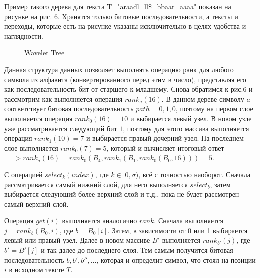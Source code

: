 \documentclass[a4paper,12pt]{article}
\begin{document}
Пример такого дерева для текста T="araadl\_ll\$\_bbaar\_aaaa" показан на рисунке на рис. 6. Хранятся только битовые последовательности, а тексты и переходы, которые есть на рисунке указаны исключительно в целях удобства и наглядности.

\begin{figure}[h!]
\caption{Wavelet Tree}
\end{figure}
\newpage

Данная структура данных позволяет выполнять операцию ранк для любого символа из алфавита (конвертированного перед этим в число), представляя его как последовательность бит от старшего к младшему. Снова обратимся к рис.6 и рассмотрим как выполняется операция $rank_a(16)$. В данном дереве символу $a$ соответствует битовая последовательность $path = {0,1,0}$, поэтому на первом слое выполняется операция $rank_0(16) = 10$ и выбирается левый узел. В новом узле уже рассматривается следующий бит $1$, поэтому для этого массива выполняется операция $rank_1(10) = 7$ и выбирается правый дочерний узел. На последнем слое выполняется $rank_0(7) = 5$, который и вычисляет итоговый ответ $=> rank_a(16) = rank_0(B_4, rank_1(B_1, rank_0(B_0, 16))) = 5$.

С операцией $select_k(index)$, где $k \in [0, \sigma)$, всё с точностью наоборот. Сначала рассматривается самый нижний слой, для него выполняется $select_b$, затем выбирается следующий более верхний слой и т.д., пока не будет рассмотрен самый верхний слой.

Операция $get(i)$ выполняется аналогично $rank$. Сначала выполняется $j = rank_b(B_0, i)$, где $b=B_0[i]$. Затем, в зависимости от 0 или 1 выбирается левый или правый узел. Далее в новом массиве $B'$ выполняется $rank_{b'}(j)$, где $b'=B'[j]$ и так далее до последнего слоя. Тем самым получится битовая последовательность $b, b', b'', ...$, которая и определит символ, что стоял на позиции $i$ в исходном тексте $T$.
\end{document}
